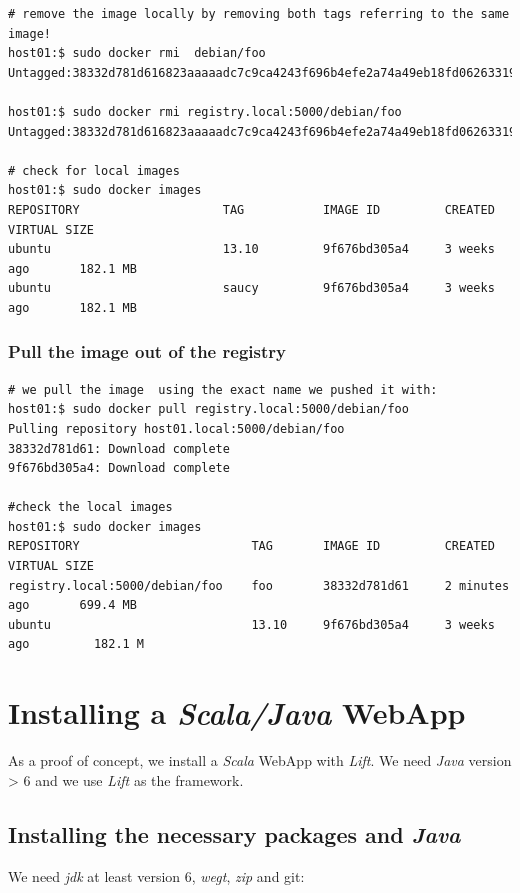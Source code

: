 \documentclass[captions=tableheading]{article}
\begin{document}
\begin{verbatim}
# remove the image locally by removing both tags referring to the same image!
host01:$ sudo docker rmi  debian/foo
Untagged:38332d781d616823aaaaadc7c9ca4243f696b4efe2a74a49eb18fd062633198d

host01:$ sudo docker rmi registry.local:5000/debian/foo
Untagged:38332d781d616823aaaaadc7c9ca4243f696b4efe2a74a49eb18fd062633198d

# check for local images
host01:$ sudo docker images
REPOSITORY                    TAG           IMAGE ID         CREATED           VIRTUAL SIZE
ubuntu                        13.10         9f676bd305a4     3 weeks ago       182.1 MB
ubuntu                        saucy         9f676bd305a4     3 weeks ago       182.1 MB
\end{verbatim}
\subsubsection{Pull the image out of the registry}
\label{sec-3-7-4}


\begin{verbatim}
# we pull the image  using the exact name we pushed it with:
host01:$ sudo docker pull registry.local:5000/debian/foo
Pulling repository host01.local:5000/debian/foo
38332d781d61: Download complete 
9f676bd305a4: Download complete

#check the local images
host01:$ sudo docker images
REPOSITORY                        TAG       IMAGE ID         CREATED             VIRTUAL SIZE
registry.local:5000/debian/foo    foo       38332d781d61     2 minutes ago       699.4 MB
ubuntu                            13.10     9f676bd305a4     3 weeks ago         182.1 M
\end{verbatim}
\section{Installing a \emph{Scala/Java} WebApp}
\label{sec-4}

As a proof of concept, we install a \emph{Scala} WebApp with \emph{Lift}. We need \emph{Java} version > 6 and we use \emph{Lift} as the framework. 
\subsection{Installing the necessary packages and \emph{Java}}
\label{sec-4-1}

We need \emph{jdk} at least version 6, \emph{wegt}, \emph{zip} and git:
\end{document}
